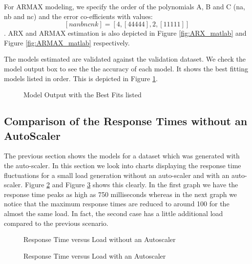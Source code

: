 \documentclass[article,type=msc,colorback,12pt,accentcolor=tud8b,table]{tudthesis}
\begin{document}
	For ARMAX modeling, we specify the order of the polynomials A, B and C (na, nb and nc) and the error co-efficients with values: $$ [na nb nc nk] = [ 4, [ 4 4 4 4 4 ], 2, [ 1 1 1 1 1 ] ]$$. ARX and ARMAX estimation is also depicted in Figure \ref{fig:ARX_matlab} and Figure \ref{fig:ARMAX_matlab} respectively.

	The models estimated are validated against the validation dataset. We check the model output box to see the the accuracy of each model. It shows the best fitting models listed in order. This is depicted in Figure \ref{fig:model_output}.
   \begin{figure}[H]
		    	\begin{center}
		    		\makebox[\textwidth]{\texttt{[image: E14]}}
		    	\end{center}
		    	\caption{Model Output with the Best Fits listed}
		    		\label{fig:model_output}
   \end{figure}
\subsection{Comparison of the Response Times without an AutoScaler}
The previous section shows the models for a dataset which was generated with the auto-scaler. In this section we look into charts displaying the response time fluctuations for a small load generation without an auto-scaler and with an auto-scaler. Figure \ref{fig:without_autoscaler} and Figure \ref{fig:with_autoscaler} shows this clearly. In the first graph we have the response time peaks as high as 750 milliseconds whereas in the next graph we notice that the maximum response times are reduced to around 100 for the almost the same load. In fact, the second case has a little additional load compared to the previous scenario.

   \begin{figure}[H]
   	\begin{center}
   		\makebox[\textwidth]{\texttt{[image: E15]}}
   	\end{center}
   	\caption{Response Time versus Load without an Autoscaler}
   		\label{fig:without_autoscaler}
   \end{figure}
   
      \begin{figure}[H]
      	\begin{center}
      		\makebox[\textwidth]{\texttt{[image: E16]}}
      	\end{center}
      	\caption{Response Time versus Load with an Autoscaler}
      		\label{fig:with_autoscaler}
      \end{figure}
\end{document}
